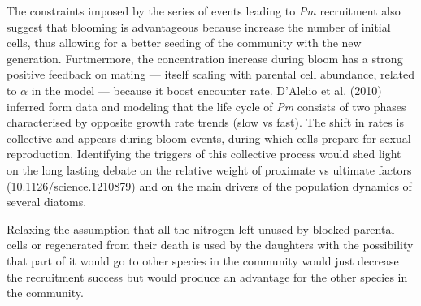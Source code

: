 \documentclass[a4paper,oneside]{article}
\begin{document}
    The constraints imposed by the series of events leading to \textit{Pm} recruitment also suggest that blooming is advantageous because increase the number of initial cells, thus allowing for a better seeding of the community with the new generation.
    Furtmermore, the concentration increase during bloom has a strong positive feedback on mating --- itself scaling with parental cell abundance, related to $\alpha$ in the model --- because it boost encounter rate.
    D'Alelio et al. (2010) inferred form data and modeling that the life cycle of \textit{Pm} consists of two phases characterised by opposite growth rate trends (slow vs fast).
    The shift in rates is collective and appears during bloom events, during which cells prepare for sexual reproduction.
    Identifying the triggers of this collective process would shed light on the long lasting debate on the relative weight of proximate vs ultimate factors (10.1126/science.1210879) and on the main drivers of the population dynamics of several diatoms.

    Relaxing the assumption that all the nitrogen left unused by blocked parental cells or regenerated from their death is used by the daughters with the possibility that part of it would go to other species in the community would just decrease the recruitment success but would produce an advantage for the other species in the community.
\end{document}
